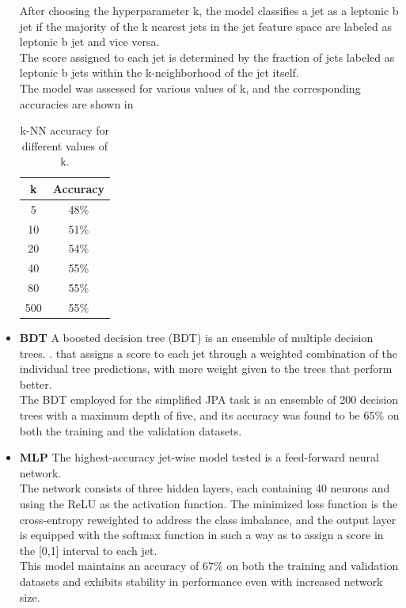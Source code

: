 \begin{itemize}
    \begin{minipage}{\linewidth}
    \begin{minipage}{0.65\linewidth}
        After choosing the hyperparameter k, the model classifies a jet as a leptonic b jet if the majority of the k nearest jets in the jet feature space are labeled as leptonic b jet and vice versa.\\
        The score assigned to each jet is determined by the fraction of jets labeled as leptonic b jets within the k-neighborhood of the jet itself.\\
        The model was assessed for various values of k, and the corresponding accuracies are shown in 
    \end{minipage}
    \hfill
        \begin{minipage}{0.3\linewidth}
        \begin{table}[H]
            \centering
             \fontsize{11.pt}{11.pt}\selectfont
            \begin{tabular}{c|c}
            \toprule
                \textbf{k} & \textbf{Accuracy} \\
                \midrule
                5 & 48\%\\
                10 & 51\%\\
                20 & 54\%\\
                40 & 55\%\\
                80 & 55\%\\
                500 & 55\%\\
            \end{tabular}
            \caption{k-NN accuracy for different values of k.}
            \label{tab:knn}
        \end{table}
        \end{minipage}
        \end{minipage}
    \item \textbf{BDT} A boosted decision tree (BDT) is an ensemble of multiple decision trees. \cite{Coadou2022BoostedTrees}. 
    that assigns a score to each jet through a weighted combination of the individual tree predictions, with more weight given to the trees that perform better.\\
    The BDT employed for the simplified JPA task is an ensemble of 200 decision trees with a maximum depth of five, and its accuracy was found to be 65\% on both the training and the validation datasets.
    \item \textbf{MLP} The highest-accuracy jet-wise model tested is a feed-forward neural network.\\
    The network consists of three hidden layers, each containing 40 neurons and using the ReLU as the activation function. The minimized loss function is the cross-entropy reweighted to address the class imbalance, and the output layer is equipped with the softmax function in such a way as to assign a score in the [0,1] interval to each jet.\\
    This model maintains an accuracy of 67\% on both the training and validation datasets and exhibits stability in performance even with increased network size.
\end{itemize}
